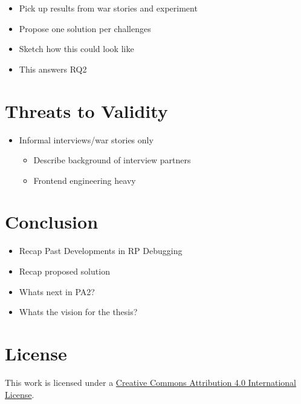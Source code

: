 \documentclass[12pt,a4paper]{article}
\begin{document}
\begin{itemize}
	\item Pick up results from war stories and experiment
	\item Propose one solution per challenges
	\item Sketch how this could look like
	\item This answers RQ2
\end{itemize}

\section{Threats to Validity}
\label{sec:threats}

\begin{itemize}
	\item Informal interviews/war stories only
	\begin{itemize}
		\item Describe background of interview partners
		\item Frontend engineering heavy
	\end{itemize}
\end{itemize}

\section{Conclusion}
\label{sec:conclusion}

\begin{itemize}
	\item Recap Past Developments in RP Debugging
	\item Recap proposed solution
	\item Whats next in PA2?
	\item Whats the vision for the thesis?
\end{itemize}







\section*{License}
\ccby\thinspace\thinspace This work is licensed under a \href{https://creativecommons.org/licenses/by/4.0/}{Creative Commons Attribution 4.0 International License}.
\end{document}
